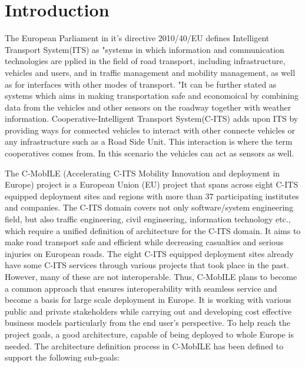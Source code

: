 \documentclass[conference]{IEEEtran}
\begin{document}
\section{Introduction}

The European Parliament in it's directive 2010/40/EU \cite{ec} defines Intelligent Transport System(ITS) as "systems in which information and communication technologies are pplied in the field of road transport, including infrastructure, vehicles and users, and in traffic management and mobility management, as well as for interfaces with other modes of transport.
"It can be further stated as systems which aims in making transportation safe and economoical by combining data from the vehicles and other sensors on the roadway together with weather information.
Cooperative-Intelligent Transport System(C-ITS) \cite{c-its} adds upon ITS by providing ways for connected vehicles to interact with other connecte vehicles or any infrastructure such as a Road Side Unit.
This interaction is where the term cooperatives comes from.
In this scenario the vehicles can act as sensors as well.

The C-MobILE (Accelerating C-ITS Mobility Innovation and deployment in Europe) project is a European Union (EU) project that spans across eight C-ITS equipped deployment sites and regions with more than 37 participating institutes and companies.
The C-ITS domain covers not only software/system engineering field, but also traffic engineering, civil engineering, information technology etc., which require a unified definition of architecture for the C-ITS domain.
It aims to make road transport safe and efficient while decreasing casualties and serious injuries on European roads.
The eight C-ITS equipped deployment sites already have some C-ITS services through various projects that took place in the past.
However, many of these are not interoperable.
Thus, C-MobILE plans to become a common approach that ensures interoperability with seamless service and become a basis for large scale deployment in Europe.
It is working with various public and private stakeholders while carrying out and developing cost effective business models particularly from the end user’s perspective.
To help reach the project goals, a good architecture, capable of being deployed to whole Europe is needed.
The architecture definition process in C-MobILE has been defined to support the following sub-goals:
\end{document}
